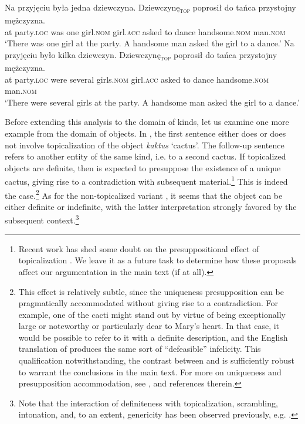 \documentclass[output=paper]{langscibook}
\begin{document}
\ea \label{ex:party}
\ea \gll
Na przyjęciu była jedna dziewczyna. Dziewczynę\textsubscript{\textsc{top}} poprosił do tańca przystojny mężczyzna.\\
at party.\textsc{loc} was one girl.\textsc{nom} girl.\textsc{acc} asked to dance handsome.\textsc{nom} man.\textsc{nom}\\

\glt `There was one girl at the party. A handsome man asked the girl to a dance.' \label{ex:party_1}
\pagebreak
\ex \gll
Na przyjęciu było kilka dziewczyn. \minsp{\#} Dziewczynę\textsubscript{\textsc{top}} poprosił do tańca przystojny mężczyzna.\\
at party.\textsc{loc} were several girls.\textsc{nom} {} girl.\textsc{acc} asked to dance handsome.\textsc{nom} man.\textsc{nom}\\

\glt `There were several girls at the party. A handsome man asked the girl to a dance.' \label{ex:party_2}
\z \z

\noindent Before extending this analysis to the domain of kinds, let us examine one more example from the domain of objects. In , the first sentence either does  or does not  involve topicalization of the object \textit{kaktus} `cactus'. The follow-up sentence refers to another entity of the same kind, i.e. to a second cactus. If topicalized objects are definite, then  is expected to presuppose the existence of a unique cactus, giving rise to a contradiction with subsequent material.\footnote{Recent work has shed some doubt on the presuppositional effect of topicalization \citep{chapters/seres, Simik.Demian2020}. We leave it as a future task to determine how these proposals affect our argumentation in the main text (if at all).} This is indeed the case.\footnote{This effect is relatively subtle, since the uniqueness presupposition can be pragmatically accommodated without giving rise to a contradiction. For example, one of the cacti might stand out by virtue of being exceptionally large or noteworthy or particularly dear to Mary's heart. In that case, it would be possible to refer to it with a definite description, and the English translation of  produces the same sort of ``defeasible'' infelicity. This qualification notwithstanding, the contrast between  and  is sufficiently robust to warrant the conclusions in the main text. For more on uniqueness and presupposition accommodation, see \citet{Frazier2006}, \citet{VonFintel2008} and references therein.} As for the non-topicalized variant , it seems that the object can be either definite or indefinite, with the latter interpretation strongly favored by the subsequent context.\footnote{Note that the interaction of definiteness with topicalization, scrambling, intonation, and, to an extent, genericity has been observed previously, e.g. \citet{Szwedek1974}.}
\end{document}
